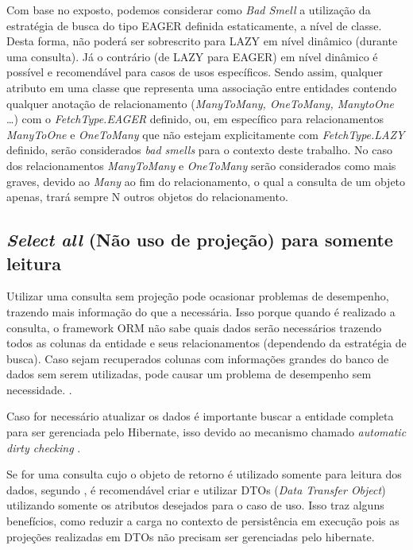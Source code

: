 Com base no exposto, podemos considerar como \textit{Bad Smell} a utilização da estratégia de busca do tipo EAGER definida estaticamente, a nível de classe. Desta forma, não poderá ser sobrescrito para LAZY em nível dinâmico (durante uma consulta). Já o contrário (de LAZY para EAGER) em nível dinâmico é possível e recomendável para casos de usos específicos. 
Sendo assim, qualquer atributo em uma classe que representa uma associação entre entidades contendo qualquer anotação de relacionamento (\textit{ManyToMany, OneToMany, ManytoOne} …) com o \textit{FetchType.EAGER} definido, ou, em específico para relacionamentos \textit{ManyToOne} e \textit{OneToMany} que não estejam explicitamente com \textit{FetchType.LAZY} definido, serão considerados \textit{bad smells} para o contexto deste trabalho.
No caso dos relacionamentos \textit{ManyToMany} e \textit{OneToMany} serão considerados como mais graves, devido ao \textit{Many} ao fim do relacionamento, o qual a consulta de um objeto apenas, trará sempre N outros objetos do relacionamento.


\subsection{\textit{Select all} (Não uso de projeção) para somente leitura}

Utilizar uma consulta sem projeção pode ocasionar problemas de desempenho, trazendo mais informação do que a necessária. Isso porque quando é realizado a consulta, o framework ORM não sabe quais dados serão necessários trazendo todos as colunas da entidade e seus relacionamentos (dependendo da estratégia de busca). Caso sejam recuperados colunas com informações grandes do banco de dados sem serem utilizadas, pode causar um problema de desempenho sem necessidade. \citep{Chen:2016:Redundant:Data}.  

Caso for necessário atualizar os dados é importante buscar a entidade completa para ser gerenciada pelo Hibernate, isso devido ao mecanismo chamado \textit{automatic dirty checking} \citep{hibernate_543}. 

Se for uma consulta cujo o objeto de retorno é utilizado somente para leitura dos dados, segundo \cite{hibernate_543}, é recomendável criar e utilizar DTOs (\textit{Data Transfer Object}) utilizando somente os atributos desejados para o caso de uso. Isso traz alguns benefícios, como reduzir a carga no contexto de persistência em execução pois as projeções realizadas em DTOs não precisam ser gerenciadas pelo hibernate.

